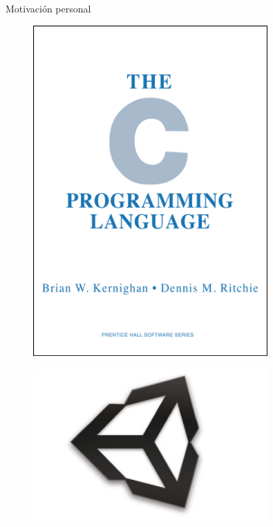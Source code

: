 \documentclass{beamer}
\begin{document}
\begin{frame}{Motivación personal}
  \begin{minipage}{0.5\textwidth}
    \begin{figure}
    \centering
    \includegraphics[width=0.8\textwidth]{img/c}
    \end{figure}
  \end{minipage}
  \begin{minipage}{0.45\textwidth}
    \begin{figure}
    \centering
    \includegraphics[width=0.8\textwidth]{img/unity}
    \end{figure}
    \end{minipage}
\end{frame}
\end{document}

